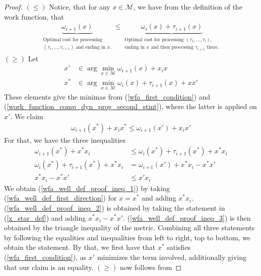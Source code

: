 \documentclass[10pt]{amsart}
\theoremstyle{definition}
\theoremstyle{remark}
\begin{document}
\begin{proof}
        \((\leq)\) Notice, that for any \(x \in \mathcal{M}\), we have from the definition of the work function, that
        \begin{align}
            \underbrace{\omega_{i+1}(x)}_{\begin{array}{c}\text{Optimal cost for processing }\\ (\tau_1, ..., \tau_{i+1}) \text{ and ending in } x\text{.}\end{array}} \leq \underbrace{\omega_i(x) + \tau_{i+1}(x)}_{\begin{array}{c}\text{Optimal cost for processing } (\tau_1, ..., \tau_i) \text{,}\\\text{ending in } x \text{ and then processing } \tau_{i+1} \text{ there.}\end{array}} \label{wfa_well_def_first_direction}
        \end{align}
        \((\geq)\) Let
        \begin{align}
            x' &\in \arg\min_{x \in \mathcal{M}} \omega_{i+1}(x) + x_ix\\
            x^* &\in \arg\min_{x \in \mathcal{M}} \omega_i(x)+\tau_{i+1}(x)+xx' \label{x_star_def}
        \end{align}
        These elements give the minimas from (\ref{wfa_first_condition}) and (\ref{work_function_comp_dyn_prog_second_stmt}), where the latter is applied on \(x'\). We claim
        \begin{align}
            \omega_{i+1}(x^*) + x_ix^* \leq \omega_{i+1}(x') + x_ix' \label{wfa_well_def_helper_claim}
        \end{align}
        For that, we have the three inequalities
        \begin{align}
            \omega_{i+1}(x^*)+x^*x_i &\leq \omega_i(x^*)+\tau_{i+1}(x^*)+x^*x_i \label{wfa_well_def_proof_ineq_1}\\
            \omega_i(x^*)+\tau_{i+1}(x^*) + x^*x_i &= \omega_{i+1}(x') + x^*x_i - x^*x' \label{wfa_well_def_proof_ineq_2}\\
            x^*x_i - x^*x' &\leq x'x_i \label{wfa_well_def_proof_ineq_3}
        \end{align}
        We obtain (\ref{wfa_well_def_proof_ineq_1}) by taking (\ref{wfa_well_def_first_direction}) for \(x = x^*\) and adding \(x^*x_i\). (\ref{wfa_well_def_proof_ineq_2}) is obtained by taking the statement in (\ref{x_star_def}) and adding \(x^*x_i-x^*x'\). (\ref{wfa_well_def_proof_ineq_3}) is then obtained by the triangle inequality of the metric. Combining all three statements by following the equalities and inequalities from left to right, top to bottom, we obtain the statement. By that, we first have that \(x^*\) satisfies (\ref{wfa_first_condition}), as \(x'\) minimizes the term involved, additionally giving that our claim is an equality. \((\geq)\) now follows from

\end{proof}
\end{document}
